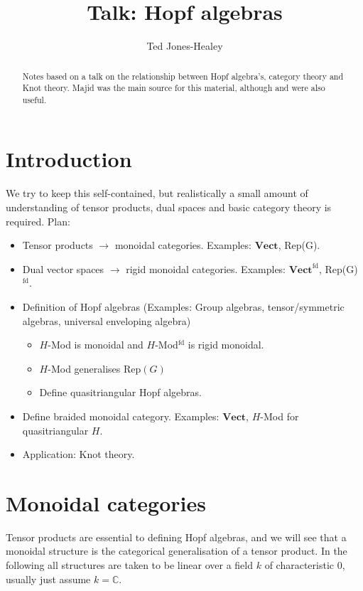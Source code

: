 \documentclass[11pt]{article}
\title{Talk: Hopf algebras}
\author{Ted Jones-Healey}
\date{}
\newcommand{\bb}{\medbreak}
\newcommand{\Cc}{\mathbb{C}}
\newcommand{\rt}{\xrightarrow{}}
\newcommand{\Vect}{\textbf{Vect}}
\theoremstyle{definition}
\begin{document}

\begin{abstract}Notes based on a talk on the relationship between Hopf algebra's, category theory and Knot theory. Majid \cite{alma9916633704401631} was the main source for this material, although \cite{etingof2016tensor} and \cite{alma9956076580001631} were also useful.\end{abstract}

\tableofcontents

\section{Introduction}
We try to keep this self-contained, but realistically a small amount of understanding of tensor products, dual spaces and basic category theory is required. Plan:
\begin{itemize}
  \item Tensor products $\rt$ monoidal categories. Examples: $\Vect$, Rep(G).
  \item Dual vector spaces $\rt$ rigid monoidal categories. Examples: $\Vect^\text{fd}$, Rep(G)$^\text{fd}$.
  \item Definition of Hopf algebras (Examples: Group algebras, tensor/symmetric algebras, universal enveloping algebra)\begin{itemize}
    \item $H$-Mod is monoidal and $H$-Mod$^\text{fd}$ is rigid monoidal.
    \item $H$-Mod generalises Rep$(G)$ 
    \item Define quasitriangular Hopf algebras.
  \end{itemize}
  \item Define braided monoidal category. Examples: $\Vect$, $H$-Mod for quasitriangular $H$.
  \item Application: Knot theory.
\end{itemize}

\section{Monoidal categories}\label{mon_cat}
Tensor products are essential to defining Hopf algebras, and we will see that a monoidal structure is the categorical generalisation of a tensor product. In the following all structures are taken to be linear over a field $k$ of characteristic $0$, usually just assume $k=\Cc$.\bb
\end{document}
